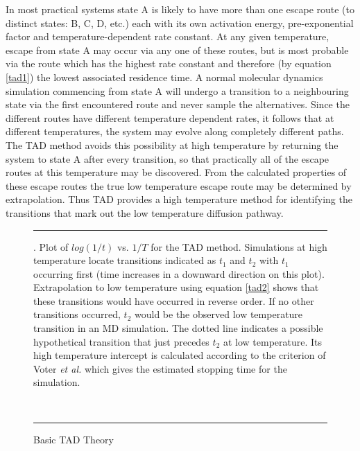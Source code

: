 In most practical systems state A is likely to have more than one escape route
(to distinct states: B, C, D, etc.) each with its own activation energy,
pre-exponential factor and temperature-dependent rate constant. At any given
temperature, escape from state A may occur via any one of these routes, but is
most probable via the route which has the highest rate constant and therefore
(by equation \ref{tad1}) the lowest associated residence time. A normal
molecular dynamics simulation commencing from state A will undergo a
transition to a neighbouring state via the first encountered route and never
sample the alternatives. Since the different routes have different temperature
dependent rates, it follows that at different temperatures, the system may
evolve along completely different paths. The TAD method avoids this
possibility at high temperature by returning the system to state A after every
transition, so that practically all of the escape routes at this temperature
may be discovered. From the calculated properties of these escape routes the
true low temperature escape route may be determined by extrapolation. Thus TAD
provides a high temperature method for identifying the transitions that mark
out the low temperature diffusion pathway.

\begin{figure}[ht]
\hrule
\vspace{1.0cm}
\begin{center}
\centerline{}
\end{center}
\caption{Basic TAD Theory\label{tadfig}}. 
Plot of $log(1/t)$ vs. $1/T$ for the TAD method. Simulations at high
temperature locate transitions indicated as $t_1$ and $t_2$ with $t_1$
occurring first (time increases in a downward direction on this
plot). Extrapolation to low temperature using equation
\ref{tad2} shows that these transitions would have occurred in reverse
order. If no other transitions occurred, $t_2$ would be the observed
low temperature transition in an MD simulation. The dotted line
indicates a possible hypothetical transition that just precedes
$t_2$ at low temperature. Its high temperature intercept is calculated
according to the criterion of Voter {\em et al.} \cite{voter-00a}
which gives the estimated stopping time for the simulation.

~
\hrule
\end{figure}

